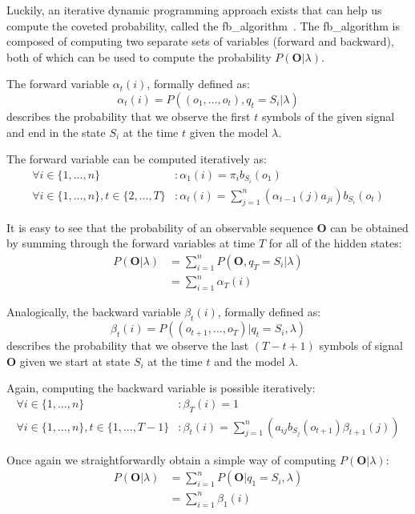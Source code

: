 Luckily, an iterative dynamic programming approach exists that can help us compute the coveted probability, called the \gls{fb_algorithm}~\cite{baum1967, baum1968}. The \gls{fb_algorithm} is composed of computing two separate sets of variables (forward and backward), both of which can be used to compute the probability $P(\mathbf{O}|\lambda)$.

The forward variable $\alpha_t(i)$, formally defined as: $$\alpha_t(i)=P((o_1, ..., o_t), q_t=S_i|\lambda)$$ describes the probability that we observe the first $t$ symbols of the given signal and end in the state $S_i$ at the time $t$ given the model $\lambda$.

The forward variable can be computed iteratively as:
\begin{align*}
\forall i\in \{1, ..., n\}&: \alpha_1(i)=\pi_ib_{S_i}(o_1)\\
\forall i\in \{1, ..., n\}, t\in\{2, ..., T\}&: \alpha_t(i) = \sum_{j=1}^n{(\alpha_{t-1}(j)a_{ji})}b_{S_i}(o_t)
\end{align*}

It is easy to see that the probability of an observable sequence $\mathbf{O}$ can be obtained by summing through the forward variables at time $T$ for all of the hidden states:
\begin{align*}
P(\mathbf{O}|\lambda) &= \sum_{i=1}^n{P(\mathbf{O}, q_T=S_i|\lambda)}\\
&= \sum_{i=1}^n{\alpha_T(i)}
\end{align*}

Analogically, the backward variable $\beta_t(i)$, formally defined as: $$\beta_t(i)=P((o_{t+1}, ..., o_T)| q_t=S_i, \lambda)$$ describes the probability that we observe the last $(T-t+1)$ symbols of signal $\mathbf{O}$ given we start at state $S_i$ at the time $t$ and the model $\lambda$.

Again, computing the backward variable is possible iteratively:
\begin{align*}
\forall i\in \{1, ..., n\}&:\beta_T(i)=1\\
\forall i\in\{1, ..., n\}, t\in\{1, ..., T-1\}&:\beta_t(i)=\sum_{j=1}^n{(a_{ij}b_{S_j}(o_{t+1})\beta_{t+1}(j))}
\end{align*}

Once again we straightforwardly obtain a simple way of computing $P(\mathbf{O}|\lambda)$:
\begin{align*}
P(\mathbf{O}|\lambda) &= \sum_{i=1}^n{P(\mathbf{O}|q_1=S_i, \lambda)}\\
&= \sum_{i=1}^n{\beta_1(i)}
\end{align*}

